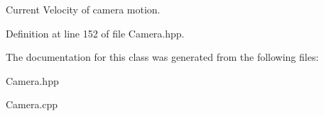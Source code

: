 Current Velocity of camera motion. 



Definition at line 152 of file Camera.\-hpp.



The documentation for this class was generated from the following files\-:\begin{DoxyCompactItemize}
\item 
Camera.\-hpp\item 
Camera.\-cpp\end{DoxyCompactItemize}
